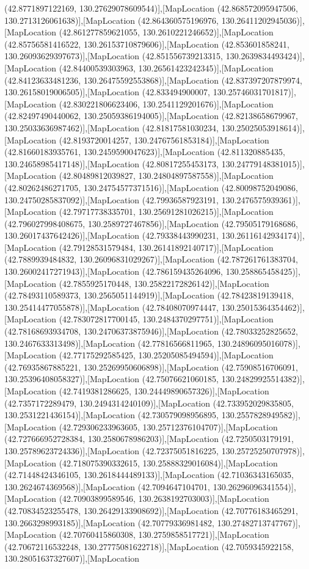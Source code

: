 (42.8771897122169, 130.27629078609544)],[MapLocation (42.868572095947506, 130.2713126061638)],[MapLocation (42.864360575196976, 130.26411202945036)],[MapLocation (42.861277859621055, 130.2610221246652)],[MapLocation (42.85756581416522, 130.26153710879606)],[MapLocation (42.853601858241, 130.26093629397673)],[MapLocation (42.851556739213315, 130.2639834493424)],[MapLocation (42.84400539303963, 130.26561423242345)],[MapLocation (42.84123633481236, 130.26475592553868)],[MapLocation (42.837397207879974, 130.26158019006505)],[MapLocation (42.833494900007, 130.25746031701817)],[MapLocation (42.830221806623406, 130.2541129201676)],[MapLocation (42.82497490440062, 130.25059386194005)],[MapLocation (42.82138658679967, 130.25033636987462)],[MapLocation (42.81817581030234, 130.25025053918614)],[MapLocation (42.8193720014257, 130.24767561853184)],[MapLocation (42.81660183935761, 130.2459590047623)],[MapLocation (42.811320885435, 130.24658985417148)],[MapLocation (42.80817255453173, 130.24779148381015)],[MapLocation (42.80489812039827, 130.24804897587558)],[MapLocation (42.80262486271705, 130.24754577371516)],[MapLocation (42.80098752049086, 130.24750285837092)],[MapLocation (42.79936587923191, 130.2476575939361)],[MapLocation (42.79717738335701, 130.25691281026215)],[MapLocation (42.796027998408675, 130.2589727467856)],[MapLocation (42.79505179168686, 130.26017437642426)],[MapLocation (42.79338443990231, 130.26116142934174)],[MapLocation (42.79128531579484, 130.26141892140717)],[MapLocation (42.7889939484832, 130.26096831029267)],[MapLocation (42.787261761383704, 130.26002417271943)],[MapLocation (42.786159435264096, 130.258865458425)],[MapLocation (42.7855925170448, 130.25822172826142)],[MapLocation (42.78493110589373, 130.2565051144919)],[MapLocation (42.78423819139418, 130.25414477055878)],[MapLocation (42.78408070974447, 130.25015364354462)],[MapLocation (42.783072817700145, 130.2484370297751)],[MapLocation (42.78168693934708, 130.24706373875946)],[MapLocation (42.78033252825652, 130.2467633313498)],[MapLocation (42.77816566811965, 130.24896095016078)],[MapLocation (42.77175292585425, 130.25205085494594)],[MapLocation (42.76935867885221, 130.25269950606898)],[MapLocation (42.75908516706091, 130.25396408058327)],[MapLocation (42.75076621060185, 130.24829925514382)],[MapLocation (42.7419381286625, 130.24449890657326)],[MapLocation (42.7357172289479, 130.2494314240109)],[MapLocation (42.733952029835805, 130.2531221436154)],[MapLocation (42.730579098956895, 130.2557828949582)],[MapLocation (42.729306233963605, 130.25712376104707)],[MapLocation (42.727666952728384, 130.2580678986203)],[MapLocation (42.7250503179191, 130.25789623724336)],[MapLocation (42.72375051816225, 130.25725250707978)],[MapLocation (42.718075390332615, 130.25888329016084)],[MapLocation (42.71448424346105, 130.2618444489133)],[MapLocation (42.71036343165035, 130.2624674369568)],[MapLocation (42.7094647104701, 130.26296096341554)],[MapLocation (42.70903899589546, 130.2638192703003)],[MapLocation (42.70834523255478, 130.26429133908692)],[MapLocation (42.70776183465291, 130.2663298993185)],[MapLocation (42.70779336981482, 130.27482713747767)],[MapLocation (42.70760415860308, 130.2759858517721)],[MapLocation (42.70672116532248, 130.27775081622718)],[MapLocation (42.7059345922158, 130.28051637327607)],[MapLocation 